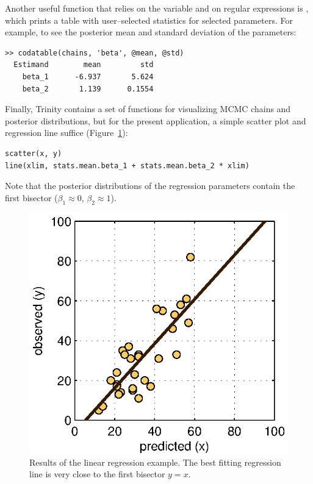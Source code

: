 Another useful function that relies on the  variable and on regular expressions is , which prints a table with user--selected statistics for selected parameters. For example, to see the posterior mean and standard deviation of the  parameters:
\begin{lstlisting}
>> codatable(chains, 'beta', @mean, @std)
  Estimand        mean         std
    beta_1      -6.937       5.624
    beta_2       1.139      0.1554
\end{lstlisting}
Finally, Trinity contains a set of functions for visualizing MCMC chains and posterior distributions, but for the present application, a simple scatter plot and regression line suffice (Figure~\ref{fig:bi3:linreg}):
\begin{lstlisting}
scatter(x, y)
line(xlim, stats.mean.beta_1 + stats.mean.beta_2 * xlim)
\end{lstlisting}
\noindent Note that the posterior distributions of the regression parameters contain the first bisector ($\beta_1 \approx 0$, $\beta_2 \approx 1$).

\begin{figure}[bt]
  \begin{center}
    \includegraphics{figs/bi3_linreg.eps}
    \caption{Results of the linear regression example. The best fitting regression line is very close to the first bisector $y=x$.} \label{fig:bi3:linreg}
  \end{center}
\end{figure}



